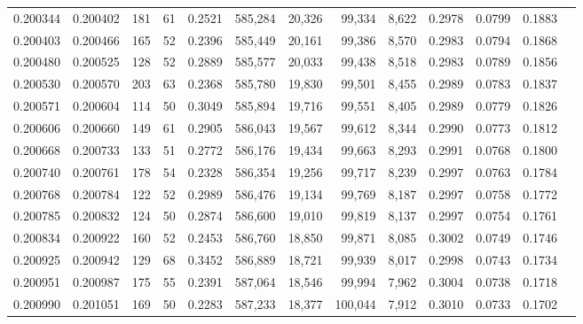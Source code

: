\begin{tabular}{rrrrrrrrrrrrr}
0.200344 & 0.200402 &   181 &  61 &                                     0.2521 & 585,284 &  20,326 &  99,334 &   8,622 & 0.2978 & 0.0799 & 0.1883 \\
0.200403 & 0.200466 &   165 &  52 &                                     0.2396 & 585,449 &  20,161 &  99,386 &   8,570 & 0.2983 & 0.0794 & 0.1868 \\
0.200480 & 0.200525 &   128 &  52 &                                     0.2889 & 585,577 &  20,033 &  99,438 &   8,518 & 0.2983 & 0.0789 & 0.1856 \\
0.200530 & 0.200570 &   203 &  63 &                                     0.2368 & 585,780 &  19,830 &  99,501 &   8,455 & 0.2989 & 0.0783 & 0.1837 \\
0.200571 & 0.200604 &   114 &  50 &                                     0.3049 & 585,894 &  19,716 &  99,551 &   8,405 & 0.2989 & 0.0779 & 0.1826 \\
0.200606 & 0.200660 &   149 &  61 &                                     0.2905 & 586,043 &  19,567 &  99,612 &   8,344 & 0.2990 & 0.0773 & 0.1812 \\
0.200668 & 0.200733 &   133 &  51 &                                     0.2772 & 586,176 &  19,434 &  99,663 &   8,293 & 0.2991 & 0.0768 & 0.1800 \\
0.200740 & 0.200761 &   178 &  54 &                                     0.2328 & 586,354 &  19,256 &  99,717 &   8,239 & 0.2997 & 0.0763 & 0.1784 \\
0.200768 & 0.200784 &   122 &  52 &                                     0.2989 & 586,476 &  19,134 &  99,769 &   8,187 & 0.2997 & 0.0758 & 0.1772 \\
0.200785 & 0.200832 &   124 &  50 &                                     0.2874 & 586,600 &  19,010 &  99,819 &   8,137 & 0.2997 & 0.0754 & 0.1761 \\
0.200834 & 0.200922 &   160 &  52 &                                     0.2453 & 586,760 &  18,850 &  99,871 &   8,085 & 0.3002 & 0.0749 & 0.1746 \\
0.200925 & 0.200942 &   129 &  68 &                                     0.3452 & 586,889 &  18,721 &  99,939 &   8,017 & 0.2998 & 0.0743 & 0.1734 \\
0.200951 & 0.200987 &   175 &  55 &                                     0.2391 & 587,064 &  18,546 &  99,994 &   7,962 & 0.3004 & 0.0738 & 0.1718 \\
0.200990 & 0.201051 &   169 &  50 &                                     0.2283 & 587,233 &  18,377 & 100,044 &   7,912 & 0.3010 & 0.0733 & 0.1702 \\

\end{tabular}
